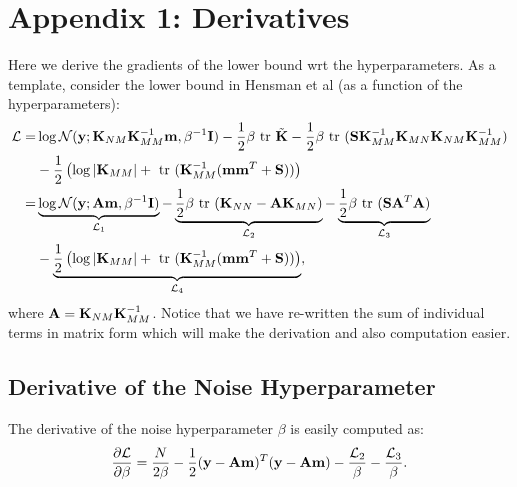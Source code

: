 \documentclass{article} %
\begin{document}
\section{Appendix 1: Derivatives}
Here we derive the gradients of the lower bound wrt the  hyperparameters.
As a template, consider the lower bound in Hensman et al (as a function of the hyperparameters):
\begin{align}
\nonumber
\mathcal{L}
=& \log \mathcal{N}(\mathbf{y}; \mathbf{K}_{NM} \mathbf{K}_{MM}^{-1} \mathbf{m}, \beta^{-1}\mathbf{I})
 - \frac{1}{2} \beta \mbox{ \rm tr } \tilde{\mathbf{K}}
 - \frac{1}{2} \beta \mbox{ \rm tr } (\mathbf{S}\mathbf{K}_{MM}^{-1} \mathbf{K}_{MN} \mathbf{K}_{NM} \mathbf{K}_{MM}^{-1}) \\  \nonumber
&- \frac{1}{2} \left( \log |\mathbf{K}_{MM}| + \mbox{ \rm tr }(\mathbf{K}_{MM}^{-1}(\mathbf{m} \mathbf{m}^T + \mathbf{S})) \right) \\ \nonumber
=& \underbrace{\log \mathcal{N}(\mathbf{y}; \mathbf{A} \mathbf{m}, \beta^{-1}\mathbf{I})}_{\mathcal{L}_1}
 - \underbrace{\frac{1}{2} \beta \mbox{ \rm tr } (\mathbf{K}_{NN} - \mathbf{A}\mathbf{K}_{MN})}_{\mathcal{L}_2}
 - \underbrace{\frac{1}{2} \beta \mbox{ \rm tr } (\mathbf{S}\mathbf{A}^T\mathbf{A})}_{\mathcal{L}_3} \\  
&- \underbrace{\frac{1}{2} \left( \log |\mathbf{K}_{MM}| + \mbox{ \rm tr }(\mathbf{K}_{MM}^{-1}(\mathbf{m} \mathbf{m}^T + \mathbf{S})) \right)}_{\mathcal{L}_4},
\end{align}
where $\mathbf{A} = \mathbf{K}_{NM} \mathbf{K}_{MM}^{-1}$.
Notice that we have re-written the sum of individual terms in matrix form which will make the derivation and also computation easier.

\subsection{Derivative of the Noise Hyperparameter}
The derivative of the noise hyperparameter $\beta$ is easily computed as:
\begin{align}
\frac{\partial{\mathcal{L}}}{\partial{\beta}} = \frac{N}{2\beta} - \frac{1}{2} (\mathbf{y} - \mathbf{A}\mathbf{m})^T (\mathbf{y} - \mathbf{A}\mathbf{m}) - \frac{\mathcal{L}_2}{\beta} - \frac{\mathcal{L}_3}{\beta}.
\end{align}
\end{document}
